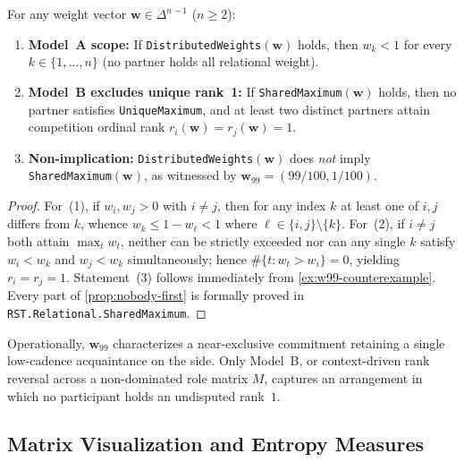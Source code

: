 \begin{proposition}
\label{prop:nobody-first}
For any weight vector $\mathbf{w} \in \Delta^{n-1}$ ($n \ge 2$):
\begin{enumerate}[nosep]
  \item \textbf{Model~A scope:} If \textnormal{\texttt{DistributedWeights}}$(\mathbf{w})$ holds,
        then $w_k < 1$ for every $k \in \{1, \dots, n\}$ (no partner holds all relational weight).
  \item \textbf{Model~B excludes unique rank~1:} If \textnormal{\texttt{SharedMaximum}}$(\mathbf{w})$
        holds, then no partner satisfies \textnormal{\texttt{UniqueMaximum}}, and at least two
        distinct partners attain competition ordinal rank $r_i(\mathbf{w}) = r_j(\mathbf{w}) = 1$.
  \item \textbf{Non-implication:} \textnormal{\texttt{DistributedWeights}}$(\mathbf{w})$ does
        \emph{not} imply \textnormal{\texttt{SharedMaximum}}$(\mathbf{w})$, as witnessed by
        $\mathbf{w}_{99} = (99/100, 1/100)$.
\end{enumerate}
\end{proposition}
\begin{proof}
For~(1), if $w_i, w_j > 0$ with $i \neq j$, then for any index $k$ at least one of $i, j$
differs from $k$, whence $w_k \le 1 - w_{\ell} < 1$ where $\ell \in \{i,j\}\setminus\{k\}$.
For~(2), if $i \neq j$ both attain $\max_t w_t$, neither can be strictly exceeded nor can any
single $k$ satisfy $w_i < w_k$ and $w_j < w_k$ simultaneously; hence $\#\{t : w_t > w_i\} = 0$,
yielding $r_i = r_j = 1$. Statement~(3) follows immediately from \cref{ex:w99-counterexample}.
Every part of \cref{prop:nobody-first} is formally proved in \texttt{RST.Relational.SharedMaximum}.
\end{proof}

\noindent\layerbehav{} Operationally, $\mathbf{w}_{99}$ characterizes a near-exclusive
commitment retaining a single low-cadence acquaintance on the side. Only Model~B,
or context-driven rank reversal across a non-dominated role matrix $M$, captures
an arrangement in which no participant holds an undisputed rank~$1$.

\subsection{Matrix Visualization and Entropy Measures}
\label{subsec:fw-matrix}

